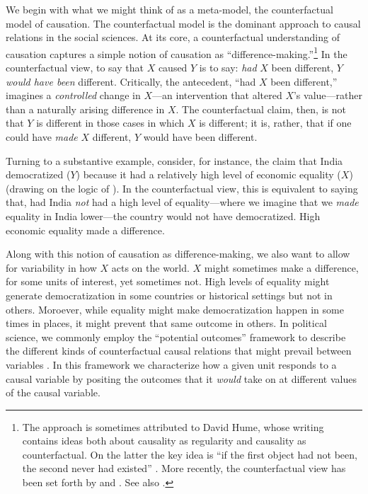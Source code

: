 \documentclass[12pt,]{book}
\let\rmarkdownfootnote\footnote%
\def\footnote{\protect\rmarkdownfootnote}
\begin{document}
We begin with what we might think of as a meta-model, the counterfactual model of causation. The counterfactual model is the dominant approach to causal relations in the social sciences. At its core, a counterfactual understanding of causation captures a simple notion of causation as ``difference-making.''\footnote{The approach is sometimes attributed to David Hume, whose writing contains ideas both about causality as regularity and causality as counterfactual. On the latter the key idea is ``if the first object had not been, the second never had existed'' \citep[Section VIII]{hume2000enquiry}. More recently, the counterfactual view has been set forth by \citet{splawa1990application} and \citet{lewis1973counterfactuals}. See also \citet{lewis1986causation}.} In the counterfactual view, to say that \(X\) caused \(Y\) is to say: \emph{had} \(X\) been different, \(Y\) \emph{would have been} different. Critically, the antecedent, ``had \(X\) been different,'' imagines a \emph{controlled} change in \(X\)---an intervention that altered \(X\)'s value---rather than a naturally arising difference in \(X\). The counterfactual claim, then, is not that \(Y\) is different in those cases in which \(X\) is different; it is, rather, that if one could have \emph{made} \(X\) different, \(Y\) would have been different.

Turning to a substantive example, consider, for instance, the claim that India democratized (\(Y\)) because it had a relatively high level of economic equality (\(X\)) (drawing on the logic of \citet{boix2003democracy}). In the counterfactual view, this is equivalent to saying that, had India \emph{not} had a high level of equality---where we imagine that we \emph{made} equality in India lower---the country would not have democratized. High economic equality made a difference.

Along with this notion of causation as difference-making, we also want to allow for variability in how \(X\) acts on the world. \(X\) might sometimes make a difference, for some units of interest, yet sometimes not. High levels of equality might generate democratization in some countries or historical settings but not in others. Moroever, while equality might make democratization happen in some times in places, it might prevent that same outcome in others. In political science, we commonly employ the ``potential outcomes'' framework to describe the different kinds of counterfactual causal relations that might prevail between variables \citep{Rubin1974}. In this framework we characterize how a given unit responds to a causal variable by positing the outcomes that it \emph{would} take on at different values of the causal variable.
\end{document}
